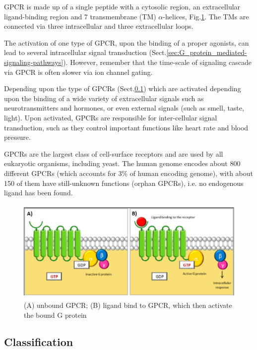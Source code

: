 GPCR is made up of a single peptide with a cytosolic region, an extracellular
ligand-binding region and 7 transmembrane (TM) $\alpha$-helices,
Fig.\ref{fig:GPCR}. The TMs are connected via three intracellular and three
extracellular loops. 

The activation of one type of GPCR, upon the binding of a proper agonists, can
lead to several intracellular signal transduction
(Sect.\ref{sec:G_protein_mediated-signaling-pathways}). However, remember that
the time-scale of signaling cascade via GPCR is often slower via ion channel
gating.

Depending upon the type of GPCRs (Sect.\ref{sec:GPCR-classification}) which are
activated depending upon the binding of a wide variety of extracellular signals
such as neurotransmitters and hormones, or even external signals (such as smell,
taste, light). Upon activated, GPCRs are responsible for inter-cellular signal
transduction, such as they control important functions like heart rate and blood
pressure.

GPCRs are the largest class of cell-surface receptors and are used by all
eukaryotic organisms, including yeast. The human genome encodes about 800
different GPCRs (which accounts for 3\% of human encoding genome), with about
150 of them have still-unknown functions (orphan GPCRs), i.e. no endogenous
ligand has been found.



\begin{figure}[hbt]
 \centerline{\includegraphics[height=5cm]{./images/GPCR.eps}}
\caption{(A) unbound GPCR; (B) ligand bind to GPCR, which then activate the
bound G protein}
\label{fig:GPCR}
\end{figure}


\subsection{Classification}
\label{sec:GPCR-classification}

